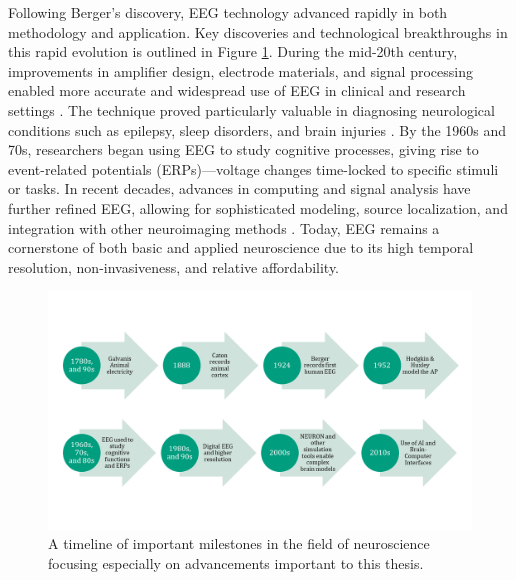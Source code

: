 \documentclass[final, a4paper,masters,en,listoffigures,listoftables,norwegiandates]{NMBU}
\begin{document}
Following Berger’s discovery, EEG technology advanced rapidly in both methodology and application. Key discoveries and technological breakthroughs in this rapid evolution is outlined in Figure \ref{fig:timeline}. During the mid-20th century, improvements in amplifier design, electrode materials, and signal processing enabled more accurate and widespread use of EEG in clinical and research settings \cite{Friston2009Modalities, Benbadis2020, BIASIUCCI2019R80}. The technique proved particularly valuable in diagnosing neurological conditions such as epilepsy, sleep disorders, and brain injuries \cite{Joshi2021}. By the 1960s and 70s, researchers began using EEG to study cognitive processes, giving rise to event-related potentials (ERPs)—voltage changes time-locked to specific stimuli or tasks. In recent decades, advances in computing and signal analysis have further refined EEG, allowing for sophisticated modeling, source localization, and integration with other neuroimaging methods \cite{MULERT200483, Halnes2024ElectricBrainSignals}. Today, EEG remains a cornerstone of both basic and applied neuroscience due to its high temporal resolution, non-invasiveness, and relative affordability.

\begin{figure}[h]
    \centering
    \includegraphics[width=\linewidth]{Figures/TimelineDiscoveries.png}
    \caption{A timeline of important milestones in the field of neuroscience focusing especially on advancements important to this thesis.}
    \label{fig:timeline}
\end{figure}
\end{document}
